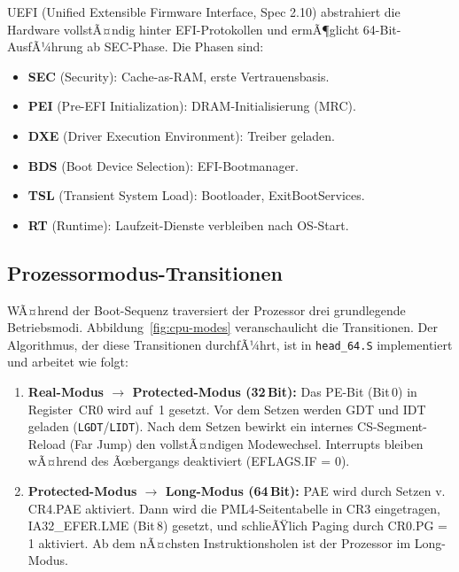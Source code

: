 ﻿\documentclass[a4paper,12pt]{scrreprt}
\theoremstyle{definition}
\begin{document}
	UEFI (Unified Extensible Firmware Interface, Spec 2.10) abstrahiert die
	Hardware vollstÃ¤ndig hinter EFI-Protokollen und ermÃ¶glicht 64-Bit-AusfÃ¼hrung
	ab SEC-Phase. Die Phasen sind:
	\begin{itemize}
		\item \textbf{SEC} (Security): Cache-as-RAM, erste Vertrauensbasis.
		\item \textbf{PEI} (Pre-EFI Initialization): DRAM-Initialisierung (MRC).
		\item \textbf{DXE} (Driver Execution Environment): Treiber geladen.
		\item \textbf{BDS} (Boot Device Selection): EFI-Bootmanager.
		\item \textbf{TSL} (Transient System Load): Bootloader, ExitBootServices.
		\item \textbf{RT} (Runtime): Laufzeit-Dienste verbleiben nach OS-Start.
	\end{itemize}

	\label{sec:uefi_phases}

	\subsection{Prozessormodus-Transitionen}

	WÃ¤hrend der Boot-Sequenz traversiert der Prozessor drei grundlegende
	Betriebsmodi. Abbildung~\ref{fig:cpu-modes} veranschaulicht die
	Transitionen. Der Algorithmus, der diese Transitionen durchfÃ¼hrt, ist
	in \texttt{head\_64.S} implementiert und arbeitet wie folgt:

	\begin{enumerate}
		\item \textbf{Real-Modus $\to$ Protected-Modus (32\,Bit):} Das
		PE-Bit (Bit\,0) in Register~CR0 wird auf~1 gesetzt. Vor dem Setzen
		werden GDT und IDT geladen (\texttt{LGDT}/\texttt{LIDT}). Nach dem
		Setzen bewirkt ein internes CS-Segment-Reload (Far Jump) den
		vollstÃ¤ndigen Modewechsel. Interrupts bleiben wÃ¤hrend des Ãœbergangs
		deaktiviert (EFLAGS.IF = 0).
		\item \textbf{Protected-Modus $\to$ Long-Modus (64\,Bit):} PAE wird
		durch Setzen v. CR4.PAE aktiviert. Dann wird die PML4-Seitentabelle
		in CR3 eingetragen, IA32\_EFER.LME (Bit\,8) gesetzt, und
		schlieÃŸlich Paging durch CR0.PG = 1 aktiviert. Ab dem nÃ¤chsten
		Instruktionsholen ist der Prozessor im Long-Modus.
	\end{enumerate}
\end{document}
